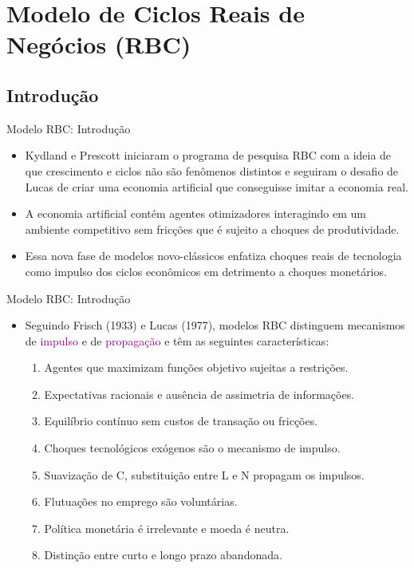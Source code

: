 \documentclass[10pt]{beamer}
\begin{document}
\section{Modelo de Ciclos Reais de Negócios (RBC)}
\subsection{Introdução}
\begin{frame}{Modelo RBC: Introdução}
    \begin{itemize}
        \item Kydland e Prescott iniciaram o programa de pesquisa RBC com a
ideia de que crescimento e ciclos não são fenômenos distintos e
seguiram o desafio de Lucas de criar uma economia artificial que
conseguisse imitar a economia real.
\bigskip
\item A economia artificial contém agentes otimizadores interagindo em um
ambiente competitivo sem fricções que é sujeito a choques de
produtividade.
\bigskip
\item Essa nova fase de modelos novo-clássicos enfatiza choques reais de tecnologia como impulso dos ciclos econômicos em detrimento a
choques monetários.
    \end{itemize}
\end{frame}

\begin{frame}{Modelo RBC: Introdução}
    \begin{itemize}
        \item Seguindo Frisch (1933) e Lucas (1977), modelos RBC distinguem mecanismos de \textcolor{purple}{impulso} e de \textcolor{purple}{propagação} e têm as seguintes características:
        \bigskip
        \begin{enumerate}
            \item Agentes que maximizam funções objetivo sujeitas a restrições.
            \bigskip
            \item Expectativas racionais e ausência de assimetria de informações.
            \bigskip
            \item Equilíbrio contínuo sem custos de transação ou fricções.
            \bigskip
            \item Choques tecnológicos exógenos são o mecanismo de impulso.
            \bigskip
            \item Suavização de C, substituição entre L e N propagam os impulsos.
            \bigskip
            \item Flutuações no emprego são voluntárias.
            \bigskip
            \item Política monetária é irrelevante e moeda é neutra.
            \bigskip
            \item Distinção entre curto e longo prazo abandonada.
        \end{enumerate}
    \end{itemize}
\end{frame}
\end{document}
